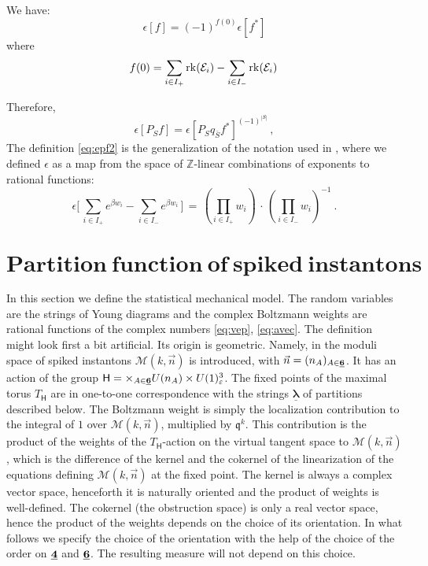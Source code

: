 \documentclass[12pt]{amsart}
\newcommand {\3}{\underline{\bf 3}}
\newcommand {\4}{\underline{\bf 4}}
\newcommand {\6}{\underline{\bf 6}}
\newcommand{\beq}{\begin{equation}}
\newcommand{\eeq}{\end{equation}}
\newcommand{\iM}{{\mathscr M}}
\newcommand {\qe} {\mathfrak q}
\newcommand {\Hf} {\mathsf{H}}
\newcommand {\bla} {\underline{\boldsymbol{\lambda}}}
\newcommand {\BZ}   {\mathbb Z}
\newcommand {\CalE} {\mathcal E}
\newcommand{\ve}{\varepsilon}
\newcommand{\ep}{\epsilon}
\newcommand{\secc}[1]{\section{$\mathbf{ #1}$}}
\begin{document}
We have:
\beq
{\ep} [ f ] = (-1)^{f(0)} {\ep} [ f^{*} ]
\label{eq:reflect}
\eeq
where
\beq
f(0) = \sum_{i \in I_{+}}  {\rm rk}({\CalE}_{i}) -  
\sum_{i \in I_{-}} {\rm rk}({\CalE}_{i}) \, 
\label{eq:fb4}
\eeq


Therefore, 
\beq
{\ep} [ P_{S} f ] = {\ep} [ P_{S} q_{\bar S} f^{*} ]^{(-1)^{|S|}}\, , 
\label{eq:refl2}
\eeq
The definition \eqref{eq:epf2} is the generalization of the notation used in 
\cite{Nekrasov:2016qym}, where 
we defined ${\ep}$ as a map from the space of ${\BZ}$-linear combinations of exponents to rational functions:
\beq
{\ep}\Biggl[  \, \sum_{i \in I_{+}} e^{{\beta}w_{i}} - \sum_{i \in I_{-}} e^{{\beta}w_{i}}\, \Biggr] \, = \, \left( \prod_{i \in I_{+}} w_{i} \right) \, \cdot \, \left( \prod_{i \in I_{-}} w_{i} \right)^{-1} \  . 
\label{eq:epf1} 
\eeq




\secc{Partition\ function\ of \ spiked\ instantons}


In this section we define the statistical mechanical model. The random variables are the strings of Young diagrams and the complex Boltzmann weights are rational functions of the 
complex numbers \eqref{eq:vep}, \eqref{eq:avec}. The definition might look first a bit artificial. Its origin is geometric. Namely, in \cite{Nekrasov:2016qym} the moduli space
of spiked instantons ${\iM}(k,{\vec n})$ is introduced, with ${\vec n} = (n_{A})_{A \in {\6}}$. It has an action of the group ${\Hf} = \times_{A \in \6} U(n_A) \times U(1)^{3}_{\ve}$. 
The fixed points of the maximal torus $T_{\Hf}$ are in one-to-one correspondence with the 
strings $\bla$ of partitions described below. The Boltzmann weight is simply the localization 
contribution to the integral of $1$ over ${\iM}(k,{\vec n})$, multiplied by ${\qe}^{k}$. 
This contribution is the product of the weights of the $T_{\Hf}$-action on the virtual tangent space to ${\iM}(k,{\vec n})$, which is the difference of the kernel and the cokernel of the linearization of the equations defining ${\iM}(k,{\vec n})$ at the fixed point. The kernel is always a complex vector space, henceforth it is naturally oriented and the product of weights is well-defined. The cokernel (the obstruction space) is only a real vector space, hence the product of the weights depends on the choice of its orientation. In what follows we specify the choice of the orientation with the help of the choice of the order on $\4$ and $\6$.  The resulting measure will not depend on this choice. 
\end{document}
